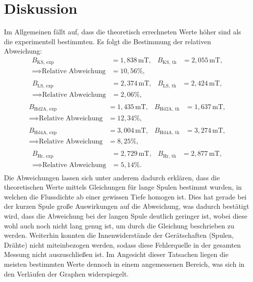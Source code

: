 \section{Diskussion}
\label{sec:Diskussion}

Im Allgemeinen fällt auf, dass die theoretisch errechneten 
Werte höher sind als die experimentell bestimmten. Es folgt die Bestimmung der relativen Abweichung:
\begin{align*}
B_\text{KS, exp} &= 1,838\,\si{\milli\tesla}, & B_\text{KS, th} &= 2,055\,\si{\milli\tesla}, \\
\implies \text{Relative Abweichung} &= 10,56\%, \\
\end{align*}
\begin{align*}
B_\text{LS, exp} &= 2,374\,\si{\milli\tesla}, & B_\text{LS, th} &= 2,424\,\si{\milli\tesla}, \\
\implies \text{Relative Abweichung} &= 2,06\%, \\
\end{align*}\begin{align*}
B_\text{Hd2A, exp} &= 1,435\,\si{\milli\tesla}, & B_\text{Hd2A, th} &= 1,637\,\si{\milli\tesla}, \\
\implies \text{Relative Abweichung} &= 12,34\%, \\
\end{align*}\begin{align*}
B_\text{Hd4A, exp} &= 3,004\,\si{\milli\tesla}, & B_\text{Hd4A, th} &= 3,274\,\si{\milli\tesla}, \\
\implies \text{Relative Abweichung} &= 8,25\%, \\
\end{align*}\begin{align*}
B_\text{Hr, exp} &= 2,729\,\si{\milli\tesla}, & B_\text{Hr, th} &= 2,877\,\si{\milli\tesla}, \\
\implies \text{Relative Abweichung} &= 5,14\%. \\
\end{align*}
Die Abweichungen lassen sich unter anderem dadurch erklären, dass 
die theoretischen Werte mittels Gleichungen für lange Spulen bestimmt
wurden, in welchen die Flussdichte ab einer gewissen Tiefe homogen ist.
Dies hat gerade bei der kurzen Spule große Auswirkungen auf die Abweichung,
was dadurch bestätigt wird, dass die Abweichung bei der langen Spule deutlich
geringer ist, wobei diese wohl auch noch nicht lang genug ist, um durch die
Gleichung beschrieben zu werden.
Weiterhin konnten die Innenwiderstände
der Gerätschaften (Spulen, Drähte) nicht miteinbezogen werden, sodass
diese Fehlerquelle in der gesamten Messung nicht auszuschließen ist.
Im Angesicht dieser Tatsachen liegen die meisten bestimmten Werte dennoch in einem
angemessenen Bereich, was sich in den Verläufen der Graphen widerspiegelt.
